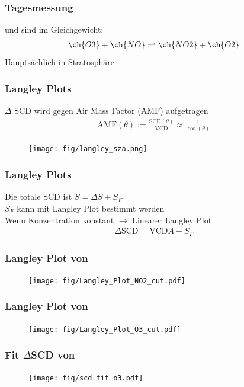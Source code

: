 \documentclass{beamer}
\begin{document}
\begin{frame}
    \frametitle{Tagesmessung }
     und  sind im Gleichgewicht:
    \begin{align}
         \ch{O3} + \ch{NO} \rightleftharpoons \ch{NO2} + \ch{O2}
    \end{align}
     Hauptsächlich in Stratosphäre
\end{frame}

\begin{frame}
    \frametitle{Langley Plots}
    $\Delta$ SCD wird gegen Air Mass Factor (AMF) aufgetragen\\
    \begin{align}
        \text{AMF}(\theta) := \frac{\text{SCD}(\theta)}{\text{VCD}} \approx \frac{1}{\cos (\theta)}
    \end{align}
    \begin{figure}
        \texttt{[image: fig/langley\_sza.png]}
    \end{figure}
\end{frame}

\begin{frame}
    \frametitle{Langley Plots}
    Die totale SCD ist $S = \Delta S + S_F$\\
    $S_F$ kann mit Langley Plot bestimmt werden\\
    Wenn Konzentration konstant $\to$ Linearer Langley Plot
    \begin{align}
    \Delta \text{SCD} = \text{VCD} A - S_F
    \end{align}
\end{frame}

\begin{frame}
    \frametitle{Langley Plot von }
    \begin{figure}
    \texttt{[image: fig/Langley\_Plot\_NO2\_cut.pdf]}
    \end{figure}
\end{frame}

\begin{frame}
    \frametitle{Langley Plot von }
    \begin{figure}
    \texttt{[image: fig/Langley\_Plot\_O3\_cut.pdf]}
    \end{figure}
\end{frame}

\begin{frame}
    \frametitle{Fit $\Delta$SCD von }
    \begin{figure}
    \texttt{[image: fig/scd\_fit\_o3.pdf]}
    \end{figure}
\end{frame}
\end{document}
